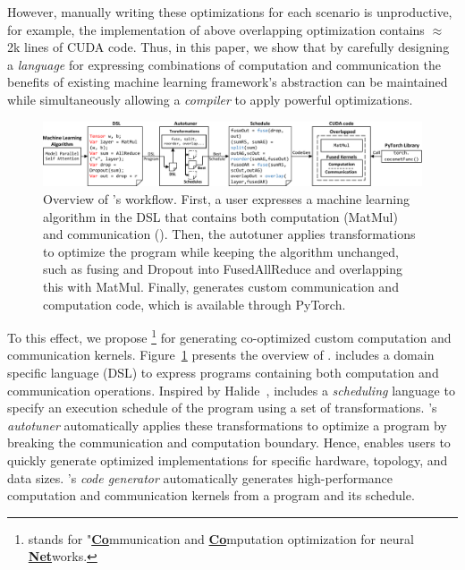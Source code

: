 However, manually writing these optimizations for each scenario is unproductive, for example, the implementation of above overlapping optimization contains $\approx$2k lines of CUDA code.
Thus, in this paper, we show that by carefully designing a \emph{language} for expressing combinations of computation and communication the benefits of existing machine learning framework's abstraction can be maintained while simultaneously allowing a \emph{compiler} to apply powerful optimizations.
\begin{figure}[t]
	\centering
    \includegraphics[width=\linewidth]{figures/overview-2}
    \caption{Overview of \tool's workflow. 
    First, a user expresses a machine learning algorithm in the DSL that contains both computation (MatMul) and communication (\allreduce).
    Then, the autotuner applies transformations to optimize the program while keeping the algorithm unchanged, such as fusing \allreduce and Dropout into FusedAllReduce and overlapping this with MatMul.
    Finally, \tool generates custom communication and computation code, which is available through PyTorch.}
    \label{fig:overview}
\end{figure}
To this effect, we propose \tool\footnote{\tool stands for "{\bf \uline{Co}}mmunication and {\bf \uline{Co}}mputation optimization for neural {\bf \uline{Net}}works.}
for generating co-optimized custom computation and communication kernels.
Figure~\ref{fig:overview} presents the overview of \tool.
\tool includes a domain specific language (DSL) to express programs containing both computation and communication operations.
Inspired by Halide~\cite{halide}, \tool includes a \emph{scheduling} language 
to specify an execution schedule of the program using a set of transformations. 
\tool's \emph{autotuner} automatically applies these transformations to optimize a program by breaking the communication and computation boundary. 
Hence, \tool enables users to quickly generate optimized implementations for 
specific hardware, topology, and data sizes.
\tool's \emph{code generator} automatically generates high-performance computation and communication kernels from a program and its schedule.
